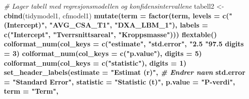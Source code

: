 \documentclass[
]{article}
\newenvironment{Shaded}{\begin{snugshade}}{\end{snugshade}}
\newcommand{\CommentTok}[1]{\textcolor[rgb]{0.56,0.35,0.01}{\textit{#1}}}
\newcommand{\DataTypeTok}[1]{\textcolor[rgb]{0.13,0.29,0.53}{#1}}
\newcommand{\DecValTok}[1]{\textcolor[rgb]{0.00,0.00,0.81}{#1}}
\newcommand{\KeywordTok}[1]{\textcolor[rgb]{0.13,0.29,0.53}{\textbf{#1}}}
\newcommand{\NormalTok}[1]{#1}
\newcommand{\OperatorTok}[1]{\textcolor[rgb]{0.81,0.36,0.00}{\textbf{#1}}}
\newcommand{\StringTok}[1]{\textcolor[rgb]{0.31,0.60,0.02}{#1}}
\begin{document}
\begin{Shaded}
\begin{Highlighting}[]
\CommentTok{# Lager tabell med regresjonsmodellen og konfidensintervallene}
\NormalTok{tabell2 <-}\StringTok{ }\KeywordTok{cbind}\NormalTok{(tidymodel1, cfmodel1) }\OperatorTok{%>%}\StringTok{ }\CommentTok{# Setter sammen tidymodel2 og cfmodel2}
\StringTok{  }\KeywordTok{mutate}\NormalTok{(}\DataTypeTok{term =} \KeywordTok{factor}\NormalTok{(term, }\DataTypeTok{levels =} \KeywordTok{c}\NormalTok{(}\StringTok{"(Intercept)"}\NormalTok{,}
                                        \StringTok{"AVG_CSA_T1"}\NormalTok{,}
                                        \StringTok{"DXA_LBM_1"}\NormalTok{),}
                       \DataTypeTok{labels =} \KeywordTok{c}\NormalTok{(}\StringTok{"Intercept"}\NormalTok{, }
                                  \StringTok{"Tverrsnittsareal"}\NormalTok{, }
                                  \StringTok{"Kroppsmasse"}\NormalTok{))) }\OperatorTok{%>%}\StringTok{ }\CommentTok{# Endrer navn på kolonnene under "term"}
\StringTok{  }\KeywordTok{flextable}\NormalTok{() }\OperatorTok{%>%}\StringTok{ }\CommentTok{# Binder sammen konfidensintervallene og regresjonsmodellen til en tabell}
\StringTok{  }\KeywordTok{colformat_num}\NormalTok{(}\DataTypeTok{col_keys =} \KeywordTok{c}\NormalTok{(}\StringTok{"estimate"}\NormalTok{, }
                             \StringTok{"std.error"}\NormalTok{,}
                             \StringTok{"2.5 %"}\NormalTok{,}
                             \StringTok{"97.5 %"}\NormalTok{), }
                \DataTypeTok{digits =} \DecValTok{3}\NormalTok{) }\OperatorTok{%>%}\StringTok{ }\CommentTok{# Endrer antall desimaler på bestemte kolonner.}
\StringTok{  }\KeywordTok{colformat_num}\NormalTok{(}\DataTypeTok{col_keys =} \KeywordTok{c}\NormalTok{(}\StringTok{"p.value"}\NormalTok{), }
                \DataTypeTok{digits =} \DecValTok{5}\NormalTok{) }\OperatorTok{%>%}
\StringTok{  }\KeywordTok{colformat_num}\NormalTok{(}\DataTypeTok{col_keys =} \KeywordTok{c}\NormalTok{(}\StringTok{"statistic"}\NormalTok{), }
                \DataTypeTok{digits =} \DecValTok{1}\NormalTok{) }\OperatorTok{%>%}
\StringTok{  }\KeywordTok{set_header_labels}\NormalTok{(}\DataTypeTok{estimate =} \StringTok{"Estimat (r)"}\NormalTok{, }\CommentTok{# Endrer navn }
                    \DataTypeTok{std.error =} \StringTok{"Standard Error"}\NormalTok{, }
                    \DataTypeTok{statistic =} \StringTok{"Statistic (t)"}\NormalTok{,}
                    \DataTypeTok{p.value =} \StringTok{"P-verdi"}\NormalTok{,}
                    \DataTypeTok{term =} \StringTok{"Term"}\NormalTok{,}
}}}}}}}}
\end{Highlighting}
\end{Shaded}
\end{document}
